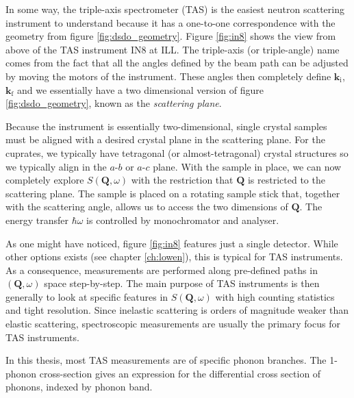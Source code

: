 In some way, the triple-axis spectrometer (TAS) is the easiest neutron scattering instrument to understand because it has a one-to-one correspondence with the geometry from figure \ref{fig:dsdo_geometry}. Figure \ref{fig:in8} shows the view from above of the TAS instrument IN8 at ILL. The triple-axis (or triple-angle) name comes from the fact that all the angles defined by the beam path can be adjusted by moving the motors of the instrument. These angles then completely define $\bm{k}_\text{i}$, $\bm{k}_\text{f}$ and we essentially have a two dimensional version of figure \ref{fig:dsdo_geometry}, known as the \emph{scattering plane}.

Because the instrument is essentially two-dimensional, single crystal samples must be aligned with a desired crystal plane in the scattering plane. For the cuprates, we typically have tetragonal (or almost-tetragonal) crystal structures so we typically align in the $a$-$b$ or $a$-$c$ plane. With the sample in place, we can now completely explore $S(\bm{Q},\omega)$ with the restriction that $\bm{Q}$ is restricted to the scattering plane. The sample is placed on a rotating sample stick that, together with the scattering angle, allows us to access the two dimensions of $\bm{Q}$. The energy transfer $\hbar\omega$ is controlled by monochromator and analyser.

As one might have noticed, figure \ref{fig:in8} features just a single detector. While other options exists (see chapter \ref{ch:lowen}), this is typical for TAS instruments. As a consequence, measurements are performed along pre-defined paths in $(\bm{Q}, \omega)$ space step-by-step. The main purpose of TAS instruments is then generally to look at specific features in $S(\bm{Q},\omega)$ with high counting statistics and tight resolution. Since inelastic scattering is orders of magnitude weaker than elastic scattering, spectroscopic measurements are usually the primary focus for TAS instruments.

In this thesis, most TAS measurements are of specific phonon branches. The 1-phonon cross-section gives an expression for the differential cross section of phonons, indexed by phonon band.


